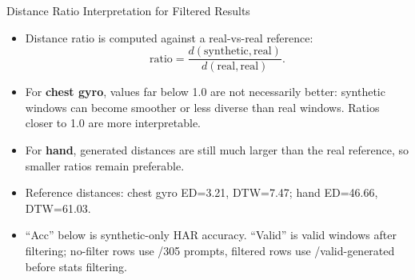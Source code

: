 
\begin{frame}{Distance Ratio Interpretation for Filtered Results}
\small
\begin{itemize}
  \item Distance ratio is computed against a real-vs-real reference:
  \[
    \mathrm{ratio}=\frac{d(\mathrm{synthetic},\mathrm{real})}{d(\mathrm{real},\mathrm{real})}.
  \]
  \item For \textbf{chest gyro}, values far below 1.0 are not necessarily better: synthetic windows can become smoother or less diverse than real windows. Ratios closer to 1.0 are more interpretable.
  \item For \textbf{hand}, generated distances are still much larger than the real reference, so smaller ratios remain preferable.
  \item Reference distances: chest gyro ED=3.21, DTW=7.47; hand ED=46.66, DTW=61.03.
  \item ``Acc'' below is synthetic-only HAR accuracy. ``Valid'' is valid windows after filtering; no-filter rows use /305 prompts, filtered rows use /valid-generated before stats filtering.
\end{itemize}
\end{frame}

